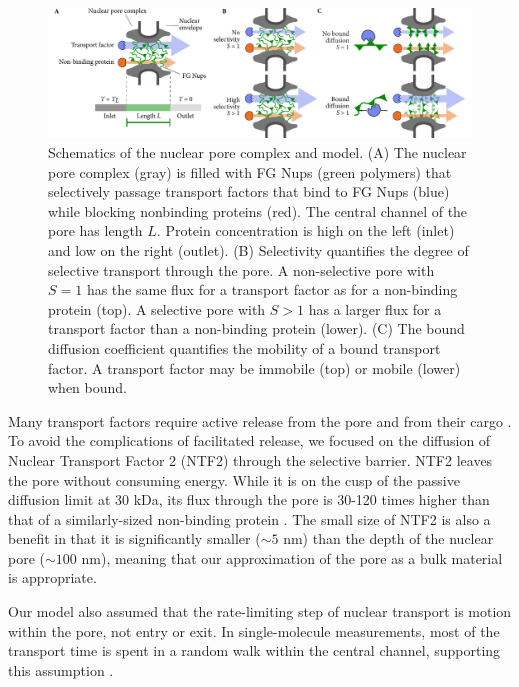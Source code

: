 \begin{figure}[t!]
\centering
\includegraphics[width=\textwidth]{figs/ch02/fig1.pdf}
\caption[Schematics of the nuclear pore complex and model.]{Schematics of the nuclear pore complex and model. (A) The
  nuclear pore complex (gray) is filled with FG Nups (green polymers)
  that selectively passage transport factors that bind to FG Nups
  (blue) while blocking nonbinding proteins (red). The central
  channel of the pore has length $L$. Protein concentration is high on
  the left (inlet) and low on the right (outlet).  (B) Selectivity
  quantifies the degree of selective transport through the pore. A
  non-selective pore with $S=1$ has the same flux for a transport
  factor as for a non-binding protein (top). A selective pore with
  $S>1$ has a larger flux for a transport factor than a non-binding
  protein (lower). (C) The bound diffusion coefficient quantifies the
  mobility of a bound transport factor.  A transport factor may be
  immobile (top) or mobile (lower) when bound. }
\label{fig:cartoon}
\end{figure}

Many transport factors require active release from the pore and from their cargo \cite{lowe15, mincer11, gorlich96, gilchrist02}.  To avoid the complications of facilitated release, we focused on the diffusion of Nuclear Transport Factor 2 (NTF2) through the selective barrier.  NTF2 leaves the pore without consuming energy.  While it is on the cusp of the passive diffusion limit at 30 kDa, its flux through the pore is 30-120 times higher than that of a similarly-sized non-binding protein \cite{mincer11, zilman07}.  The small size of NTF2 is also a benefit in that it is significantly smaller ($\sim 5$ nm) than the depth of the nuclear pore ($\sim 100$ nm), meaning that our approximation of the pore as a bulk material is appropriate.

Our model also assumed that the rate-limiting step of nuclear transport is motion within the pore, not entry or exit.  In single-molecule measurements, most of the transport time is spent in a random walk within the central channel, supporting this assumption \cite{yang04, tu13}.

